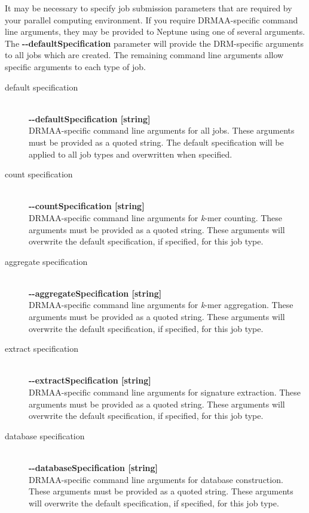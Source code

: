 \documentclass[a4paper,10pt]{article}
\begin{document}
It may be necessary to specify job submission parameters that are required by your parallel computing environment. If you require DRMAA-specific command line arguments, they may be provided to Neptune using one of several arguments. The \mbox{\textbf{-{}-defaultSpecification}} parameter will provide the DRM-specific arguments to all jobs which are created. The remaining command line arguments allow specific arguments to each type of job.

\begin{description}

  \item[default specification] \hfill \\
  \textbf{-{}-defaultSpecification [string]} \hfill \\
  DRMAA-specific command line arguments for all jobs. These arguments must be provided as a quoted string. The default specification will be applied to all job types and overwritten when specified.
  
  \item[count specification] \hfill \\
  \textbf{-{}-countSpecification [string]} \hfill \\
  DRMAA-specific command line arguments for \textit{k}-mer counting. These arguments must be provided as a quoted string. These arguments will overwrite the default specification, if specified, for this job type.
  
  \item[aggregate specification] \hfill \\
  \textbf{-{}-aggregateSpecification [string]} \hfill \\
  DRMAA-specific command line arguments for \textit{k}-mer aggregation. These arguments must be provided as a quoted string. These arguments will overwrite the default specification, if specified, for this job type.
  
  \item[extract specification] \hfill \\
  \textbf{-{}-extractSpecification [string]} \hfill \\
  DRMAA-specific command line arguments for signature extraction. These arguments must be provided as a quoted string. These arguments will overwrite the default specification, if specified, for this job type.
  
  \item[database specification] \hfill \\
  \textbf{-{}-databaseSpecification [string]} \hfill \\
  DRMAA-specific command line arguments for database construction. These arguments must be provided as a quoted string. These arguments will overwrite the default specification, if specified, for this job type.
  

\end{description}
\end{document}

